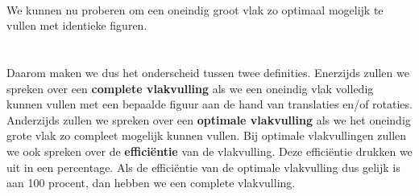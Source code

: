 \\
We kunnen nu proberen om een oneindig groot vlak zo optimaal mogelijk te vullen met identieke figuren.\\
\\
\\
Daarom maken we dus het onderscheid tussen twee definities. Enerzijds zullen we spreken over een \textbf{complete vlakvulling} als we een oneindig vlak volledig kunnen vullen met een bepaalde figuur aan de hand van translaties en/of rotaties. Anderzijds zullen we spreken over een \textbf{optimale vlakvulling} als we het oneindig grote vlak zo compleet mogelijk kunnen vullen. Bij optimale vlakvullingen zullen we ook spreken over de \textbf{effici\"{e}ntie} van de vlakvulling. Deze effici\"{e}ntie drukken we uit in een percentage. Als de effici\"{e}ntie van de optimale vlakvulling dus gelijk is aan 100 procent, dan hebben we een complete vlakvulling.
